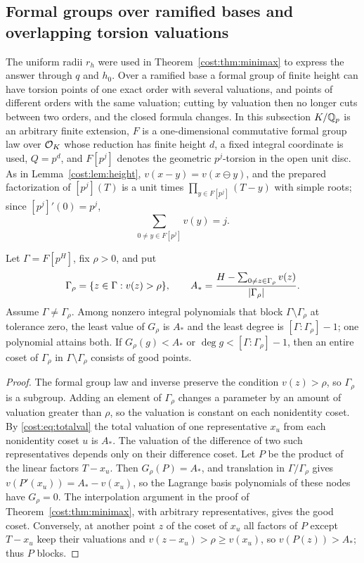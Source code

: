 \subsection{Formal groups over ramified bases and overlapping torsion valuations}\label{cost:sec:ramified}
{\raggedright{}}

The uniform radii $r_h$ were used in Theorem~\ref{cost:thm:minimax} to express the answer through
$q$ and $h_0$. Over a ramified base a formal group of finite height can have torsion points
of one exact order with several valuations, and points of different orders with the same
valuation; cutting by valuation then no longer cuts between two orders, and the closed
formula changes. In this subsection $K/\mathbb{Q}_p$ is an arbitrary finite extension, $F$ is a
one-dimensional commutative formal group law over $\mathcal{O}_K$ whose reduction has finite height
$d$, a fixed integral coordinate is used, $Q=p^d$, and $F[p^j]$ denotes the geometric
$p^j$-torsion in the open unit disc. As in Lemma~\ref{cost:lem:height}, $v(x-y)=v(x\ominus y)$,
and the prepared factorization of $[p^j](T)$ is a unit times $\prod_{y\in F[p^j]}(T-y)$ with
simple roots; since $[p^j]'(0)=p^j$,
\begin{equation}\label{cost:eq:totalval}
 \sum_{0\ne y\in F[p^j]}v(y)=j.
\end{equation}

\begin{proposition}\label{cost:prop:cutoff}
Let $\Gamma=F[p^H]$, fix $\rho>0$, and put
\[
 \Gamma_\rho=\{z\in\Gamma:v(z)>\rho\},\qquad
 A_*=\frac{H-\sum_{0\ne z\in\Gamma_\rho}v(z)}{\lvert\Gamma_\rho\rvert}.
\]
Assume $\Gamma\ne\Gamma_\rho$. Among nonzero integral polynomials that block
$\Gamma\setminus\Gamma_\rho$ at tolerance zero, the least value of $G_\rho$ is $A_*$ and the
least degree is $[\Gamma:\Gamma_\rho]-1$; one polynomial attains both. If
$G_\rho(g)<A_*$ or $\deg g<[\Gamma:\Gamma_\rho]-1$, then an entire coset of $\Gamma_\rho$ in
$\Gamma\setminus\Gamma_\rho$ consists of good points.
\end{proposition}

\begin{proof}
The formal group law and inverse preserve the condition $v(z)>\rho$, so $\Gamma_\rho$ is a
subgroup. Adding an element of $\Gamma_\rho$ changes a parameter by an amount of valuation
greater than $\rho$, so the valuation is constant on each nonidentity coset. By
\eqref{cost:eq:totalval} the total valuation of one representative $x_u$ from each
nonidentity coset $u$ is $A_*$. The valuation of the difference of two such representatives
depends only on their difference coset. Let $P$ be the product of the linear factors
$T-x_u$. Then $G_\rho(P)=A_*$, and translation in $\Gamma/\Gamma_\rho$ gives
$v(P'(x_u))=A_*-v(x_u)$, so the Lagrange basis polynomials of these nodes have $G_\rho=0$.
The interpolation argument in the proof of Theorem~\ref{cost:thm:minimax}, with arbitrary
representatives, gives the good coset. Conversely, at another point $z$ of the coset of
$x_u$ all factors of $P$ except $T-x_u$ keep their valuations and
$v(z-x_u)>\rho\ge v(x_u)$, so $v(P(z))>A_*$; thus $P$ blocks.
\end{proof}

